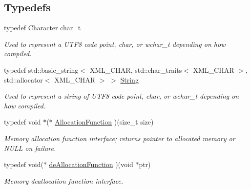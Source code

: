 \subsection*{Typedefs}
\begin{DoxyCompactItemize}
\item 
typedef \hyperlink{namespacephys_a3098bae5b0a3cd16eec331f766cc562b}{Character} \hyperlink{namespacephys_1_1xml_afc87705cd1c2917d87b879715a2d8f6e}{char\_\-t}
\begin{DoxyCompactList}\small\item\em Used to represent a UTF8 code point, char, or wchar\_\-t depending on how compiled. \item\end{DoxyCompactList}\item 
typedef std::basic\_\-string$<$ XML\_\-CHAR, std::char\_\-traits$<$ XML\_\-CHAR $>$, std::allocator$<$ XML\_\-CHAR $>$ $>$ \hyperlink{namespacephys_1_1xml_a4d8ca7638328d16d303e5a4c849f4704}{String}
\begin{DoxyCompactList}\small\item\em Used to represent a string of UTF8 code point, char, or wchar\_\-t depending on how compiled. \item\end{DoxyCompactList}\item 
\hypertarget{namespacephys_1_1xml_a6d772c4cf52d017d4d6ad68ddcbd493f}{
typedef void $\ast$($\ast$ \hyperlink{namespacephys_1_1xml_a6d772c4cf52d017d4d6ad68ddcbd493f}{AllocationFunction} )(size\_\-t size)}
\label{d9/d27/namespacephys_1_1xml_a6d772c4cf52d017d4d6ad68ddcbd493f}

\begin{DoxyCompactList}\small\item\em Memory allocation function interface; returns pointer to allocated memory or NULL on failure. \item\end{DoxyCompactList}\item 
\hypertarget{namespacephys_1_1xml_af98b1cb6640aa712180aad89a1c776d8}{
typedef void($\ast$ \hyperlink{namespacephys_1_1xml_af98b1cb6640aa712180aad89a1c776d8}{deAllocationFunction} )(void $\ast$ptr)}
\label{d9/d27/namespacephys_1_1xml_af98b1cb6640aa712180aad89a1c776d8}

\begin{DoxyCompactList}\small\item\em Memory deallocation function interface. \item\end{DoxyCompactList}\end{DoxyCompactItemize}

